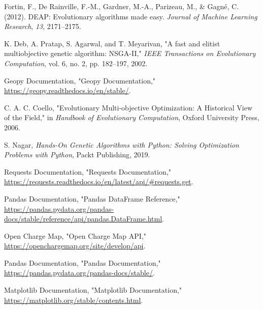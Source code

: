 \begin{thebibliography}{99}
    Fortin, F., De Rainville, F.-M., Gardner, M.-A., Parizeau, M., \& Gagné, C. (2012). DEAP: Evolutionary algorithms made easy. \textit{Journal of Machine Learning Research}, \textit{13}, 2171--2175.

    
     K. Deb, A. Pratap, S. Agarwal, and T. Meyarivan, "A fast and elitist multiobjective genetic algorithm: NSGA-II," \textit{IEEE Transactions on Evolutionary Computation}, vol. 6, no. 2, pp. 182–197, 2002.
    
     Geopy Documentation, "Geopy Documentation," \url{https://geopy.readthedocs.io/en/stable/}.
    
     C. A. C. Coello, "Evolutionary Multi-objective Optimization: A Historical View of the Field," in \textit{Handbook of Evolutionary Computation}, Oxford University Press, 2006.
    
     S. Nagar, \textit{Hands-On Genetic Algorithms with Python: Solving Optimization Problems with Python}, Packt Publishing, 2019.

     Requests Documentation, "Requests Documentation,"  \url{https://requests.readthedocs.io/en/latest/api/\#requests.get}.
    
     Pandas Documentation, "Pandas DataFrame Reference," \url{https://pandas.pydata.org/pandas-docs/stable/reference/api/pandas.DataFrame.html}.



    
     Open Charge Map, "Open Charge Map API," \url{https://openchargemap.org/site/develop/api}.
    


     Pandas Documentation, "Pandas Documentation," \url{https://pandas.pydata.org/pandas-docs/stable/}.
    
    Matplotlib Documentation, "Matplotlib Documentation," \url{https://matplotlib.org/stable/contents.html}.
    

       

\end{thebibliography}
